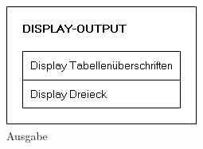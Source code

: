 \begin{figure}
    \centering
    \includegraphics[width=\linewidth]{images/display_output.jpg}
    \caption{Ausgabe}
\end{figure}
